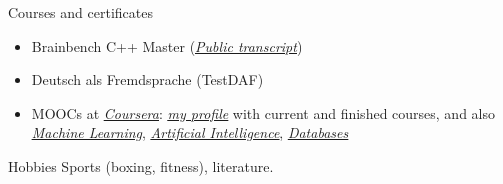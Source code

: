 \documentclass{resume} %
\newcommand{\hreftext}[1]{\underline{\textit{#1}}}
\begin{document}
\begin{rSection}{Courses and certificates}
\begin{itemize}
\item Brainbench C++ Master (\href{http://www.brainbench.com/content/transcript/topicdetail.do?testid=12320176}{\hreftext{Public transcript}})

\item Deutsch als Fremdsprache (TestDAF)

\item MOOCs at \href{http://coursera.org}{\hreftext{Coursera}}: \href{http://www.coursera.org/user/i/e2d8625ac8ed6c7665b8ad68b990e47b}{\hreftext{my profile}} with current and finished courses, and also \href{http://ml-class.org}{\hreftext{Machine Learning}}, \href{http://ai-class.org}{\hreftext{Artificial Intelligence}}, \href{http://db-class.org}{\hreftext{Databases}} 

\end{itemize}
\end{rSection}


\begin{rSection}{Hobbies}
Sports (boxing, fitness), literature.
\end{rSection}

\end{document}
